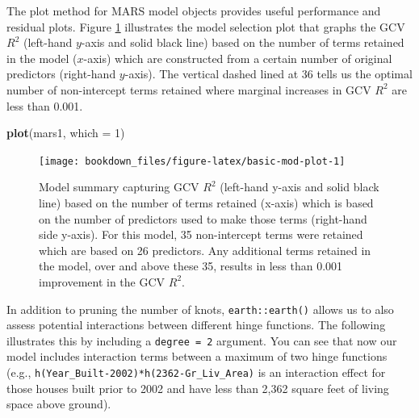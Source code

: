 \documentclass[]{krantz}
\makeatletter
\newenvironment{Shaded}{\begin{snugshade}}{\end{snugshade}}
\newcommand{\DataTypeTok}[1]{\textcolor[rgb]{0.27,0.27,0.27}{#1}}
\newcommand{\DecValTok}[1]{\textcolor[rgb]{0.06,0.06,0.06}{#1}}
\newcommand{\KeywordTok}[1]{\textcolor[rgb]{0.27,0.27,0.27}{\textbf{#1}}}
\newcommand{\NormalTok}[1]{#1}
\newenvironment{kframe}{%
\medskip{}
\setlength{\fboxsep}{.8em}
 \def\at@end@of@kframe{}%
 \ifinner\ifhmode%
  \def\at@end@of@kframe{\end{minipage}}%
  \begin{minipage}{\columnwidth}%
 \fi\fi%
 \def\FrameCommand##1{\hskip\@totalleftmargin \hskip-\fboxsep
 \colorbox{shadecolor}{##1}\hskip-\fboxsep
     \hskip-\linewidth \hskip-\@totalleftmargin \hskip\columnwidth}%
 \MakeFramed {\advance\hsize-\width
   \@totalleftmargin\z@ \linewidth\hsize
   \@setminipage}}%
 {\par\unskip\endMakeFramed%
 \at@end@of@kframe}
\renewenvironment{Shaded}{\begin{kframe}}{\end{kframe}}
\makeatother
\begin{document}
The plot method for MARS model objects provides useful performance and residual plots. Figure \ref{fig:basic-mod-plot} illustrates the model selection plot that graphs the GCV \(R^2\) (left-hand \(y\)-axis and solid black line) based on the number of terms retained in the model (\(x\)-axis) which are constructed from a certain number of original predictors (right-hand \(y\)-axis). The vertical dashed lined at 36 tells us the optimal number of non-intercept terms retained where marginal increases in GCV \(R^2\) are less than 0.001.

\begin{Shaded}
\begin{Highlighting}[]
\KeywordTok{plot}\NormalTok{(mars1, }\DataTypeTok{which =} \DecValTok{1}\NormalTok{)}
\end{Highlighting}
\end{Shaded}

\begin{figure}

{\centering \texttt{[image: bookdown\_files/figure-latex/basic-mod-plot-1]} 

}

\caption{Model summary capturing GCV $R^2$ (left-hand y-axis and solid black line) based on the number of terms retained (x-axis) which is based on the number of predictors used to make those terms (right-hand side y-axis). For this model, 35 non-intercept terms were retained which are based on 26 predictors.  Any additional terms retained in the model, over and above these 35, results in less than 0.001 improvement in the GCV $R^2$.}\label{fig:basic-mod-plot}
\end{figure}

In addition to pruning the number of knots, \texttt{earth::earth()} allows us to also assess potential interactions between different hinge functions. The following illustrates this by including a \texttt{degree\ =\ 2} argument. You can see that now our model includes interaction terms between a maximum of two hinge functions (e.g., \texttt{h(Year\_Built-2002)*h(2362-Gr\_Liv\_Area)} is an interaction effect for those houses built prior to 2002 and have less than 2,362 square feet of living space above ground).
\end{document}

